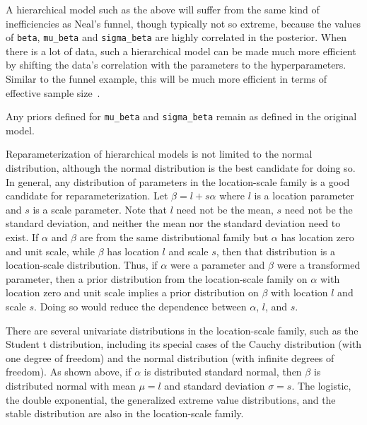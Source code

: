 A hierarchical model such as the above will suffer from the same kind
of inefficiencies as Neal's funnel, though typically not so extreme,
because the values of \Verb|beta|, \Verb|mu_beta| and
\Verb|sigma_beta| are highly correlated in the posterior. When there is a lot of data, such a
hierarchical model can be made much more efficient by shifting the data's correlation with the 
parameters to the hyperparameters. Similar to the funnel example, this will be much more 
efficient in terms of effective sample size~\citep{Betancourt-Girolami:2013}.
%
\begin{stancode}
parameters {
  vector[K] beta_raw;
  ...
transformed parameters {
  vector[K] beta;
  // implies: beta ~ normal(mu_beta,sigma_beta)
  beta <- mu_beta + sigma_beta * beta_raw;
model {
  beta_raw ~ normal(0,1);  
  ...
\end{stancode}
%
Any priors defined for \Verb|mu_beta| and \Verb|sigma_beta| remain as
defined in the original model.

Reparameterization of hierarchical models is not limited to the normal
distribution, although the normal distribution is the best candidate
for doing so. In general, any distribution of parameters in the 
location-scale family is a good candidate for reparameterization. Let
$\beta = l + s\alpha$ where $l$ is a location parameter and $s$ is a
scale parameter. Note that $l$ need not be the mean, $s$ need not
be the standard deviation, and neither the mean nor the standard
deviation need to exist. If $\alpha$ and $\beta$ are from the same
distributional family but $\alpha$ has location zero and unit scale, 
while $\beta$ has location $l$ and scale $s$, then that distribution
is a location-scale distribution. Thus, if $\alpha$ were a parameter
and $\beta$ were a transformed parameter, then a prior distribution
from the location-scale family on $\alpha$ with location zero and unit 
scale implies a prior distribution on $\beta$ with location $l$ and
scale $s$. Doing so would reduce the dependence between $\alpha$, 
$l$, and $s$.

There are several univariate distributions in the location-scale
family, such as the Student t distribution, including its special
cases of the Cauchy distribution (with one degree of freedom) and the
normal distribution (with infinite degrees of freedom). As shown above,
if $\alpha$ is distributed standard normal, then $\beta$ is distributed
normal with mean $\mu = l$ and standard deviation $\sigma = s$. The 
logistic, the double exponential, the generalized extreme value 
distributions, and the stable distribution are also in the 
location-scale family.

